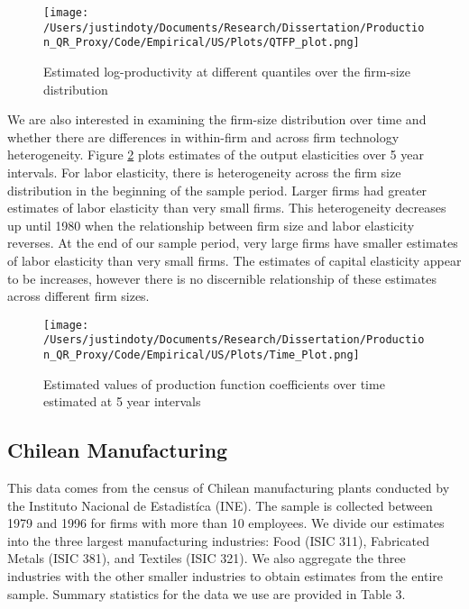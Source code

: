 \documentclass[11pt]{article}
\begin{document}
\begin{figure}[H]
\centering
\texttt{[image: /Users/justindoty/Documents/Research/Dissertation/Production\_QR\_Proxy/Code/Empirical/US/Plots/QTFP\_plot.png]}
\caption{Estimated log-productivity at different quantiles over the firm-size distribution}
\label{fig:USpdisp}
\end{figure}

We are also interested in examining the firm-size distribution over time and whether there are differences in within-firm and across firm technology heterogeneity. Figure \ref{fig:UStimecoef} plots estimates of the output elasticities over 5 year intervals. For labor elasticity, there is heterogeneity across the firm size distribution in the beginning of the sample period. Larger firms had greater estimates of labor elasticity than very small firms. This heterogeneity decreases up until 1980 when the relationship between firm size and labor elasticity reverses. At the end of our sample period, very large firms have smaller estimates of labor elasticity than very small firms. The estimates of capital elasticity appear to be increases, however there is no discernible relationship of these estimates across different firm sizes. 

\begin{figure}[H]
\centering
\texttt{[image: /Users/justindoty/Documents/Research/Dissertation/Production\_QR\_Proxy/Code/Empirical/US/Plots/Time\_Plot.png]}
\caption{Estimated values of production function coefficients over time estimated at 5 year intervals}
\label{fig:UStimecoef}
\end{figure}



\subsection{Chilean Manufacturing}
This data comes from the census of Chilean manufacturing plants conducted by the Instituto Nacional de Estadist\'ica (INE). The sample is collected between 1979 and 1996 for firms with more than 10 employees. We divide our estimates into the three largest manufacturing industries: Food (ISIC 311), Fabricated Metals (ISIC 381), and Textiles (ISIC 321). We also aggregate the three industries with the other smaller industries to obtain estimates from the entire sample. Summary statistics for the data we use are provided in Table 3.
\end{document}
